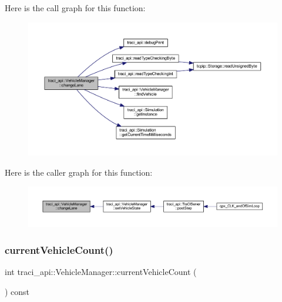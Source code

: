 Here is the call graph for this function\+:
\nopagebreak
\begin{figure}[H]
\begin{center}
\leavevmode
\includegraphics[width=350pt]{classtraci__api_1_1_vehicle_manager_a5441f5ea01a06473f831ac85b9a6c70f_cgraph}
\end{center}
\end{figure}
Here is the caller graph for this function\+:
\nopagebreak
\begin{figure}[H]
\begin{center}
\leavevmode
\includegraphics[width=350pt]{classtraci__api_1_1_vehicle_manager_a5441f5ea01a06473f831ac85b9a6c70f_icgraph}
\end{center}
\end{figure}
\mbox{\label{classtraci__api_1_1_vehicle_manager_a97816bd56b6f2e6949d175de86c712d6}} 
\subsubsection{\texorpdfstring{current\+Vehicle\+Count()}{currentVehicleCount()}}
{\footnotesize\ttfamily int traci\+\_\+api\+::\+Vehicle\+Manager\+::current\+Vehicle\+Count (\begin{DoxyParamCaption}{ }\end{DoxyParamCaption}) const}

